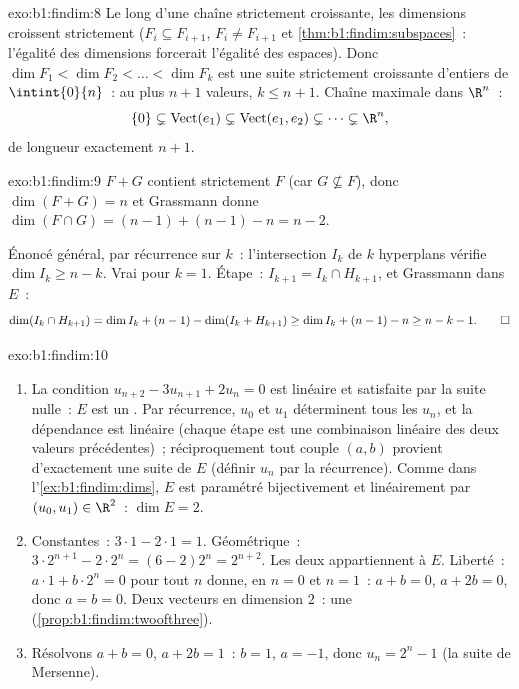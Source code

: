 \begin{solution}{exo:b1:findim:8}
Le long d'une chaîne strictement croissante, les dimensions croissent
strictement ($F_i \subseteq F_{i+1}$, $F_i \neq F_{i+1}$ et
\cref{thm:b1:findim:subspaces}~: l'égalité des dimensions forcerait
l'égalité des espaces). Donc $\dim F_1 < \dim F_2 < \dots < \dim F_k$
est une suite strictement croissante d'entiers de $\intint{0}{n}$~: au
plus $n + 1$ valeurs, $k \leq n + 1$. Chaîne maximale dans $\R^n$~:
\[
\{0\} \subsetneq \operatorname{Vect}(e_1) \subsetneq
\operatorname{Vect}(e_1, e_2) \subsetneq \dots \subsetneq \R^n ,
\]
de longueur exactement $n + 1$.
\end{solution}

\begin{solution}{exo:b1:findim:9}
$F + G$ contient strictement $F$ (car $G \not\subseteq F$), donc
$\dim(F + G) = n$ et Grassmann donne $\dim(F \cap G) = (n-1) +
(n-1) - n = n - 2$.

Énoncé général, par récurrence sur $k$~: l'intersection $I_k$ de $k$
hyperplans vérifie $\dim I_k \geq n - k$. Vrai pour $k = 1$. Étape~:
$I_{k+1} = I_k \cap H_{k+1}$, et Grassmann dans $E$~:
\[
\dim(I_k \cap H_{k+1}) = \dim I_k + (n - 1) - \dim(I_k + H_{k+1})
\geq \dim I_k + (n-1) - n \geq n - k - 1 . \qedhere
\]
\end{solution}

\begin{solution}{exo:b1:findim:10}
\begin{enumerate}
  \item La condition $u_{n+2} - 3u_{n+1} + 2u_n = 0$ est linéaire et
        satisfaite par la suite nulle~: $E$ est un . Par
        récurrence, $u_0$ et $u_1$ déterminent tous les $u_n$, et la
        dépendance est linéaire (chaque étape est une combinaison
        linéaire des deux valeurs précédentes)~; réciproquement tout
        couple $(a, b)$ provient d'exactement une suite de $E$ (définir
        $u_n$ par la récurrence). Comme dans
        l'\cref{ex:b1:findim:dims}, $E$ est paramétré bijectivement et
        linéairement par $(u_0, u_1) \in \R^2$~: $\dim E = 2$.
  \item Constantes~: $3\cdot1 - 2\cdot1 = 1$. Géométrique~: $3\cdot
        2^{n+1} - 2\cdot 2^n = (6 - 2)2^n = 2^{n+2}$. Les deux
        appartiennent à $E$. Liberté~: $a\cdot 1 + b\cdot 2^n = 0$ pour
        tout $n$ donne, en $n = 0$ et $n = 1$~: $a + b = 0$, $a + 2b =
        0$, donc $a = b = 0$. Deux vecteurs  en dimension $2$~:
        une  (\cref{prop:b1:findim:twoofthree}).
  \item Résolvons $a + b = 0$, $a + 2b = 1$~: $b = 1$, $a = -1$, donc
        $u_n = 2^n - 1$ (la suite de Mersenne).
\end{enumerate}
\end{solution}

